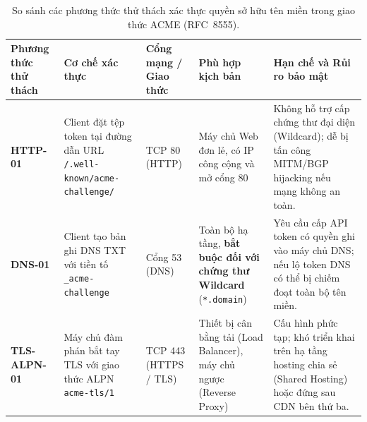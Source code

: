 \begin{table}[!htbp]
\centering
\small
\renewcommand{\arraystretch}{1.2}
\begin{tabularx}{\textwidth}{>{\raggedright\arraybackslash}p{2.3cm}>{\raggedright\arraybackslash}p{3.1cm}>{\centering\arraybackslash}p{1.9cm}>{\raggedright\arraybackslash}p{3.0cm}>{\raggedright\arraybackslash}X}
\toprule
\textbf{Phương thức thử thách} & \textbf{Cơ chế xác thực} & \textbf{Cổng mạng / Giao thức} & \textbf{Phù hợp kịch bản} & \textbf{Hạn chế và Rủi ro bảo mật} \\
\midrule
\textbf{HTTP-01} & Client đặt tệp token tại đường dẫn URL \texttt{/.well-known/}\allowbreak\texttt{acme-challenge/} & TCP 80 (HTTP) & Máy chủ Web đơn lẻ, có IP công cộng và mở cổng 80 & Không hỗ trợ cấp chứng thư đại diện (Wildcard); dễ bị tấn công MITM/BGP hijacking nếu mạng không an toàn. \\
\midrule
\textbf{DNS-01} & Client tạo bản ghi DNS TXT với tiền tố \texttt{\_acme-}\allowbreak\texttt{challenge} & Cổng 53 (DNS) & Toàn bộ hạ tầng, \textbf{bắt buộc đối với chứng thư Wildcard} (\texttt{*.domain}) & Yêu cầu cấp API token có quyền ghi vào máy chủ DNS; nếu lộ token DNS có thể bị chiếm đoạt toàn bộ tên miền. \\
\midrule
\textbf{TLS-ALPN-01} & Máy chủ đàm phán bắt tay TLS với giao thức ALPN \texttt{acme-tls/1} & TCP 443 (HTTPS / TLS) & Thiết bị cân bằng tải (Load Balancer), máy chủ ngược (Reverse Proxy) & Cấu hình phức tạp; khó triển khai trên hạ tầng hosting chia sẻ (Shared Hosting) hoặc đứng sau CDN bên thứ ba. \\
\bottomrule
\end{tabularx}
\caption{So sánh các phương thức thử thách xác thực quyền sở hữu tên miền trong giao thức ACME (RFC~8555).}
\label{tab:acme-challenges}
\end{table}

